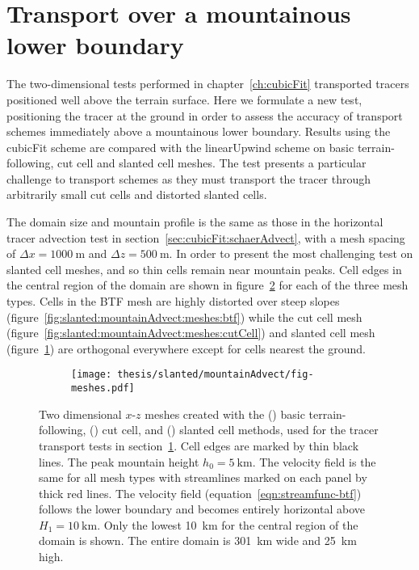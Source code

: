 \section{Transport over a mountainous lower boundary}
\label{sec:slanted:mountainAdvect}

The two-dimensional tests performed in chapter~\ref{ch:cubicFit} transported tracers positioned well above the terrain surface.  Here we formulate a new test, positioning the tracer at the ground in order to assess the accuracy of transport schemes immediately above a mountainous lower boundary.  Results using the cubicFit scheme are compared with the linearUpwind scheme on basic terrain-following, cut cell and slanted cell meshes.
The test presents a particular challenge to transport schemes as they must transport the tracer through arbitrarily small cut cells and distorted slanted cells.

The domain size and mountain profile is the same as those in the horizontal tracer advection test in section~\ref{sec:cubicFit:schaerAdvect}, with a mesh spacing of $\Delta x = \SI{1000}{\meter}$ and $\Delta z = \SI{500}{\meter}$.
In order to present the most challenging test on slanted cell meshes, and so thin cells remain near mountain peaks.
Cell edges in the central region of the domain are shown in figure~\ref{fig:slanted:mountainAdvect:meshes} for each of the three mesh types.
Cells in the BTF mesh are highly distorted over steep slopes (figure~\ref{fig:slanted:mountainAdvect:meshes:btf}) while the cut cell mesh (figure~\ref{fig:slanted:mountainAdvect:meshes:cutCell}) and slanted cell mesh (figure~\ref{fig:slanted:mountainAdvect:meshes:slantedCell}) are orthogonal everywhere except for cells nearest the ground.

\begin{figure}
	\centering
	\begin{subfigure}{\textwidth}
		\label{fig:slanted:mountainAdvect:meshes:btf}
		\label{fig:slanted:mountainAdvect:meshes:cutCell}
		\label{fig:slanted:mountainAdvect:meshes:slantedCell}
		\texttt{[image: thesis/slanted/mountainAdvect/fig-meshes.pdf]}
	\end{subfigure}
%
	\caption{Two dimensional $x$-$z$ meshes created with the () basic terrain-following,
	() cut cell, and
	() slanted cell methods, used for the tracer transport tests in section~\ref{sec:slanted:mountainAdvect}.  Cell edges are marked by thin black lines.  The peak mountain height $h_0 = \SI{5}{\kilo\meter}$.
The velocity field is the same for all mesh types with streamlines marked on each panel by thick red lines.
The velocity field (equation~\ref{eqn:streamfunc-btf}) follows the lower boundary and becomes entirely horizontal above $H_1 = \SI{10}{\kilo\meter}$.
Only the lowest \SI{10}{\kilo\meter} for the central region of the domain is shown.  The entire domain is \SI{301}{\kilo\meter} wide and \SI{25}{\kilo\meter} high.}
	\label{fig:slanted:mountainAdvect:meshes}
\end{figure}

